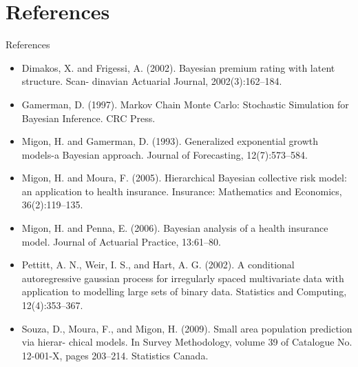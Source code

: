\documentclass[10pt]{beamer} %
\begin{document}
\section{References}
\begin{frame}{References}
    \begin{itemize}
    \item Dimakos, X. and Frigessi, A. (2002). Bayesian premium rating with latent structure. Scan-
dinavian Actuarial Journal, 2002(3):162--184. 
        \item Gamerman, D. (1997). Markov Chain Monte Carlo: Stochastic Simulation for Bayesian
Inference. CRC Press.
\item Migon, H. and Gamerman, D. (1993). Generalized exponential growth models-a Bayesian approach. Journal of Forecasting, 12(7):573--584.
\item Migon, H. and Moura, F. (2005). Hierarchical Bayesian collective risk model: an application to health insurance. Insurance: Mathematics and Economics, 36(2):119--135.
\item Migon, H. and Penna, E. (2006). Bayesian analysis of a health insurance model. Journal of Actuarial Practice, 13:61--80.
\item Pettitt, A. N., Weir, I. S., and Hart, A. G. (2002). A conditional autoregressive gaussian
process for irregularly spaced multivariate data with application to modelling large
sets of binary data. Statistics and Computing, 12(4):353--367.
\item Souza, D., Moura, F., and Migon, H. (2009). Small area population prediction via hierar-
chical models. In Survey Methodology, volume 39 of Catalogue No. 12-001-X, pages
203--214. Statistics Canada.
    \end{itemize}
\end{frame}
\end{document}
